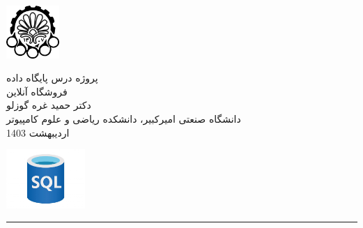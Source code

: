 \begin{minipage}{0.1\textwidth}
\includegraphics[width=2cm]{etc/aut}
\end{minipage}%
\hfill%
\begin{minipage}{0.6\textwidth}\centering
\fontsize{10pt}{10pt}\selectfont
پروژه درس پایگاه داده \\
فروشگاه آنلاین\\ 
دکتر حمید غره گوزلو \\
\vspace{0.25cm}
\begingroup
\fontsize{8pt}{8pt}\selectfont
دانشگاه صنعتی امیرکبیر، دانشکده ریاضی و علوم کامپیوتر \\
اردیبهشت 1403  \\
\endgroup
\end{minipage}%
\hfill%
\begin{minipage}{0.1\textwidth}
\includegraphics[width=3cm]{etc/database log.jpg}
\end{minipage}

\vspace{0.5cm}

\noindent\rule{\textwidth}{1pt}